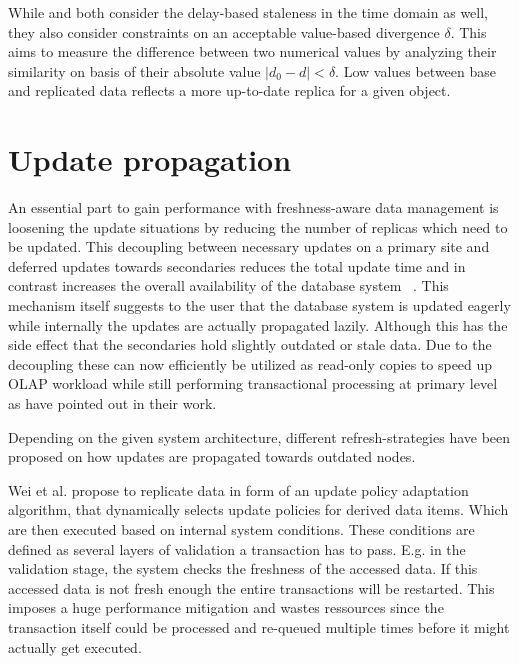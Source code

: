 While \cite{xiang:2008} and \cite{fekete:2018} both consider the delay-based staleness in the time domain as well, they also consider constraints on 
an acceptable value-based divergence $\delta$. This aims to measure the difference between two numerical values by analyzing their similarity on basis of their 
absolute value $|d_0 - d| < \delta $. Low values between base and replicated data reflects a more up-to-date replica for a given object.




\section{Update propagation}
\label{r:replication}
An essential part to gain performance with freshness-aware data management is loosening the update situations by reducing the number of 
replicas which need to be updated. This decoupling between necessary updates on a primary site and deferred updates towards secondaries 
reduces the total update time and in contrast increases the overall availability of the database system ~\cite{quorums:2003}.
This mechanism itself suggests to the user that the database system is updated eagerly while internally the updates are actually propagated lazily. 
Although this has the side effect that the secondaries hold slightly outdated or stale data.
Due to the decoupling these can now efficiently be utilized as read-only copies to speed up OLAP workload while still performing transactional processing 
at primary level as \cite{psaroudakis:2015, rohm:2002, xiang:2008} have pointed out in their work.

Depending on the given system architecture, different refresh-strategies have been proposed on how updates are propagated towards outdated nodes.

Wei et al. \cite{wei:2004} propose to replicate data in form of an update policy adaptation algorithm, that dynamically selects update policies
for derived data items. Which are then executed based on internal system conditions. These conditions are defined as several layers of validation a transaction has to pass.
E.g. in the validation stage, the system checks the freshness of the accessed data. If this accessed data is not fresh enough the entire transactions will be restarted.
This imposes a huge performance mitigation and wastes ressources since the transaction itself could be processed and re-queued multiple times before it might actually get executed.\\

